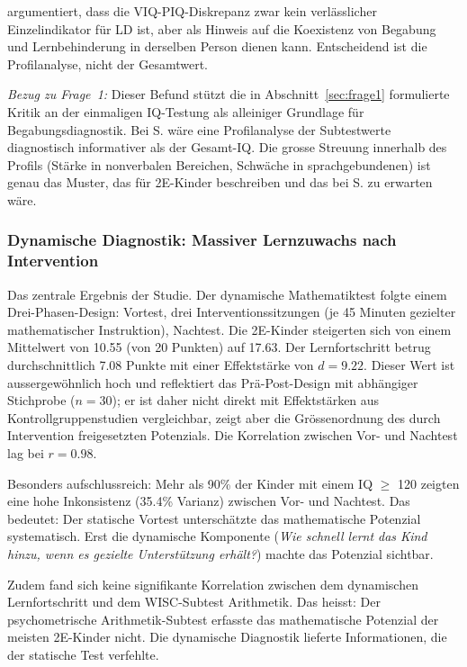 \documentclass[ngerman, a4paper]{article}
\begin{document}
\textcite{alhroub2021utility} argumentiert, dass die
VIQ-PIQ-Diskrepanz zwar kein verlässlicher
Einzelindikator für LD ist, aber als Hinweis auf die Koexistenz von
Begabung und Lernbehinderung in derselben Person dienen kann. Entscheidend
ist die Profilanalyse, nicht der Gesamtwert.

\textit{Bezug zu Frage~1:} Dieser Befund stützt die in
Abschnitt~\ref{sec:frage1} formulierte Kritik an der einmaligen
IQ-Testung als alleiniger Grundlage für Begabungsdiagnostik. Bei S. wäre
eine Profilanalyse der Subtestwerte diagnostisch informativer als der
Gesamt-IQ. Die grosse Streuung innerhalb des Profils (Stärke in
nonverbalen Bereichen, Schwäche in sprachgebundenen) ist genau das Muster,
das \textcite[Kap.\,2.2]{preckel2013hochbegabung} für 2E-Kinder beschreiben und das
bei S. zu erwarten wäre.

\subsubsection*{Dynamische Diagnostik: Massiver Lernzuwachs nach
  Intervention}

Das zentrale Ergebnis der Studie. Der dynamische Mathematiktest folgte
einem Drei-Phasen-Design: Vortest, drei Interventionssitzungen (je 45
Minuten gezielter mathematischer Instruktion), Nachtest. Die 2E-Kinder
steigerten sich von einem Mittelwert von 10.55 (von 20 Punkten) auf
17.63. Der Lernfortschritt betrug durchschnittlich 7.08 Punkte mit einer
Effektstärke von $d = 9.22$. Dieser Wert ist aussergewöhnlich hoch und
reflektiert das Prä-Post-Design mit abhängiger Stichprobe ($n = 30$); er
ist daher nicht direkt mit Effektstärken aus Kontrollgruppenstudien
vergleichbar, zeigt aber die Grössenordnung des durch Intervention
freigesetzten Potenzials. Die
Korrelation zwischen Vor- und Nachtest lag bei $r = 0.98$.

Besonders aufschlussreich: Mehr als 90\% der Kinder mit einem IQ $\geq$
120 zeigten eine hohe Inkonsistenz (35.4\% Varianz) zwischen Vor- und
Nachtest. Das bedeutet: Der statische Vortest unterschätzte das
mathematische Potenzial systematisch. Erst die dynamische Komponente
(\textit{Wie schnell lernt das Kind hinzu, wenn es gezielte Unterstützung
  erhält?}) machte das Potenzial sichtbar.

Zudem fand sich keine signifikante Korrelation zwischen dem dynamischen
Lernfortschritt und dem WISC-Subtest Arithmetik. Das heisst: Der
psychometrische Arithmetik-Subtest erfasste das mathematische Potenzial
der meisten 2E-Kinder nicht. Die dynamische Diagnostik lieferte
Informationen, die der statische Test verfehlte.
\end{document}
